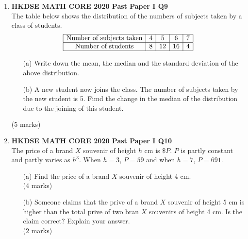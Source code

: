\documentclass[12pt]{article}
\begin{document}
\begin{enumerate}
	\item \textbf{HKDSE MATH CORE 2020 Past Paper I Q9}\\
	The table below shows the distribution of the numbers of subjects taken by a class of students.
	$$\begin{array}{|c|c|c|c|c|}
		\hline
		\text{Number of subjects taken} & 4 & 5 & 6 & 7 \\
		\hline
		\text{Number of students} & 8 & 12 & 16 & 4 \\
		\hline
	\end{array}$$
	\begin{enumerate}
		\item[(a)] Write down the mean, the median and the standard deviation of the above distribution.
		\item[(b)] A new student now joins the class. The number of subjects taken by the new student is 5. Fimd the change in the median of the distribution due to the joining of this student.
	\end{enumerate}
	(5 marks)

	\item \textbf{HKDSE MATH CORE 2020 Past Paper I Q10}\\
	The price of a brand $X$ souvenir of height $h$ cm is $\$P$. $P$ is partly constant and partly varies as $h^3$. When $h = 3$, $P = 59$ and when $h = 7$, $P = 691$.
	\begin{enumerate}
		\item[(a)] Find the price of a brand $X$ souvenir of height 4 cm. \\(4 marks)
		\item[(b)] Someone claims that the prive of a brand $X$ souvenir of height 5 cm is higher than the total prive of two bran $X$ souvenirs of height 4 cm. Is the claim correct? Explain your answer. \\(2 marks)
	\end{enumerate}


\end{enumerate}
\end{document}
